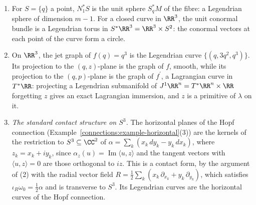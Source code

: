 \begin{example}\label{symplectic-geometry:example-contact}
\begin{enumerate}
\item For $S = \{q\}$ a point, $N^*_1S$ is the unit sphere $S^*_qM$ of the fibre: a Legendrian sphere of dimension $m - 1$. For a closed curve in $\RR^3$, the unit conormal bundle is a Legendrian torus in
$S^*\RR^3 = \RR^3 \times S^2$: the conormal vectors at each point of the curve form a circle.
\item On $\RR^3$, the jet graph of $f(q) = q^3$ is the Legendrian curve $\{(q, 3q^2, q^3)\}$. Its projection to the $(q, z)$-plane is the graph of $f$, smooth, while its projection to the $(q, p)$-plane is the
graph of $f^{\prime}$, a Lagrangian curve in $T^*\RR$: projecting a Legendrian submanifold of $J^1\RR^n = T^*\RR^n \times \RR$ forgetting $z$ gives an exact Lagrangian immersion, and $z$ is a primitive of
$\lambda$ on it.
\item \emph{The standard contact structure on $S^3$.} The horizontal planes of the Hopf connection (Example~\ref{connections:example-horizontal}(3)) are the kernels of the restriction to $S^3 \subseteq \CC^2$ of
$\alpha = \sum_k(x_k\,dy_k - y_k\,dx_k)$, where $z_k = x_k + iy_k$, since $\alpha_z(u) = \operatorname{Im}\langle u, z\rangle$ and the tangent vectors with $\langle u, z\rangle = 0$ are those orthogonal to $iz$. This is a contact
form, by the argument of (2) with the radial vector field $R = \frac12\sum_k(x_k\,\partial_{x_k} + y_k\,\partial_{y_k})$, which satisfies $\iota_R\omega_0 = \frac12\alpha$ and is transverse to $S^3$. Its Legendrian curves are the
horizontal curves of the Hopf connection.
\end{enumerate}
\end{example}

